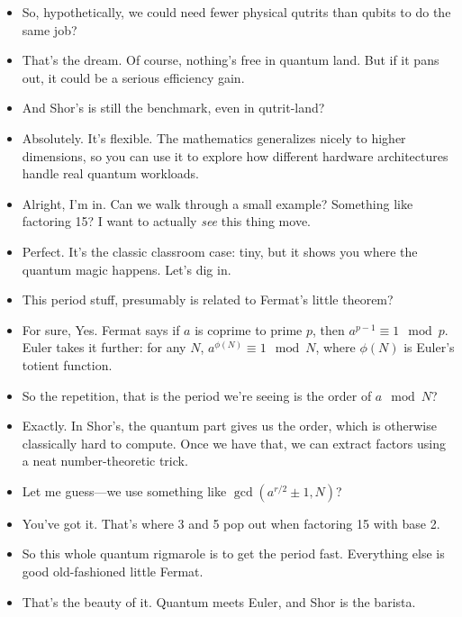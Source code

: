 \begin{itemize}[leftmargin=1.5cm]
  \item[Eleanor:] So, hypothetically, we could need fewer physical qutrits than qubits to do the same job?

  \item[Nina:] That’s the dream. Of course, nothing’s free in quantum land. But if it pans out, it could be a serious efficiency gain.

  \item[Eleanor:] And Shor’s is still the benchmark, even in qutrit-land?

  \item[Nina:] Absolutely. It’s flexible. The mathematics generalizes nicely to higher dimensions, so you can use it to explore how different hardware architectures handle real quantum workloads.

  \item[Eleanor:] Alright, I’m in. Can we walk through a small example? Something like factoring 15? I want to actually \textit{see} this thing move.

  \item[Nina:] Perfect. It’s the classic classroom case: tiny, but it shows you where the quantum magic happens. Let’s dig in.

  \item[Eleanor:] This period stuff, presumably is related to Fermat’s little theorem?

  \item[Nina:] For sure, Yes. Fermat says if \( a \) is coprime to prime \( p \), then \( a^{p-1} \equiv 1 \mod p \). Euler takes it further: for any \( N \), \( a^{\phi(N)} \equiv 1 \mod N \), where \( \phi(N) \) is Euler’s totient function.

  \item[Eleanor:] So the repetition, that is the period we’re seeing is the order of \( a \mod N \)?

  \item[Nina:] Exactly. In Shor’s, the quantum part gives us the order, which is otherwise classically hard to compute. Once we have that, we can extract factors using a neat number-theoretic trick.

  \item[Eleanor:] Let me guess—we use something like \( \gcd(a^{r/2} \pm 1, N) \)?

  \item[Nina:] You’ve got it. That’s where 3 and 5 pop out when factoring 15 with base 2.

  \item[Eleanor:] So this whole quantum rigmarole is to get the period fast. Everything else is good old-fashioned little Fermat.

  \item[Nina:] That’s the beauty of it. Quantum meets Euler, and Shor is the barista.

\end{itemize}

